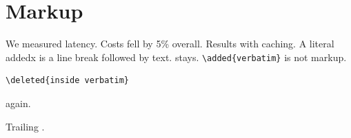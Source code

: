 \section{Markup}

We measured  latency.
Costs fell by 5\%  overall.
Results  with caching.
A literal \\added{x} is a line break followed by text.
 stays.
\verb|\added{verbatim}| is not markup.
\begin{verbatim}
\deleted{inside verbatim}
\end{verbatim}
 again.


Trailing \added{anonymous %
text}.
